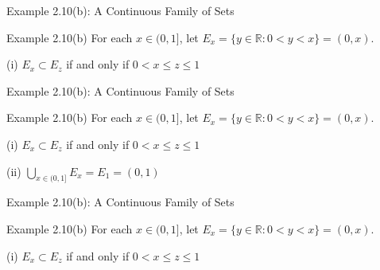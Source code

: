 \documentclass[aspectratio=169,12pt,t]{beamer}
\begin{document}
{%
\begin{frame}{Example 2.10(b): A Continuous Family of Sets}
  \begin{exblock}{Example 2.10(b)}
    For each $x \in (0, 1]$, let $E_x = \{y \in \mathbb{R} : 0 < y < x\} = (0, x)$.
  \end{exblock}

  \vspace{0.3em}
  \begin{hlbox}
    (i) $E_x \subset E_z$ if and only if $0 < x \leq z \leq 1$
  \end{hlbox}

\end{frame}

\begin{frame}{Example 2.10(b): A Continuous Family of Sets}
  \begin{exblock}{Example 2.10(b)}
    For each $x \in (0, 1]$, let $E_x = \{y \in \mathbb{R} : 0 < y < x\} = (0, x)$.
  \end{exblock}

  \vspace{0.3em}
  \begin{hlbox}
    (i) $E_x \subset E_z$ if and only if $0 < x \leq z \leq 1$

    \vspace{0.3em}
    (ii) $\displaystyle\bigcup_{x \in (0,1]} E_x = E_1 = (0, 1)$
  \end{hlbox}

\end{frame}

\begin{frame}{Example 2.10(b): A Continuous Family of Sets}
  \begin{exblock}{Example 2.10(b)}
    For each $x \in (0, 1]$, let $E_x = \{y \in \mathbb{R} : 0 < y < x\} = (0, x)$.
  \end{exblock}

  \vspace{0.3em}
  \begin{hlbox}
    (i) $E_x \subset E_z$ if and only if $0 < x \leq z \leq 1$


\end{hlbox}
\end{frame}}
\end{document}
